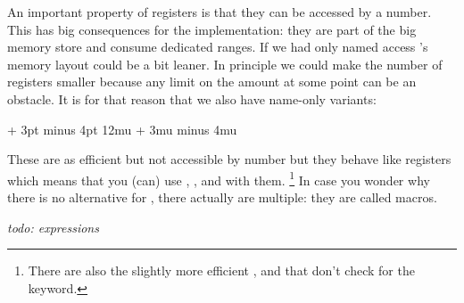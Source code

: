 An important property of registers is that they can be accessed by a number. This
has big consequences for the implementation: they are part of the big memory
store and consume dedicated ranges. If we had only named access \TEX's memory
layout could be a bit leaner. In principle we could make the number of registers
smaller because any limit on the amount at some point can be an obstacle. It is
for that reason that we also have name-only variants:

\starttyping[option=TEX]
\dimensiondef \MyDimenA   12pt
\integerdef   {}
\gluespecdef  \MyGlueA    12pt + 3pt minus 4pt
\mugluespecdef\MyMuA      12mu + 3mu minus 4mu
\stoptyping

These are as efficient but not accessible by number but they behave like
registers which means that you (can) use \type {\the}, \type {\advance}, \type
{\multiply} and \type {\divide} with them. \footnote {There are also the slightly
more efficient \type {\advanceby}, \type {\multiplyby} and \type {\divideby} that
don't check for the  keyword.} In case you wonder why there is no
alternative for \type {\toksdef}, there actually are multiple: they are called
macros.

{\em todo: expressions}

\stopsectionlevel

\stopdocument

